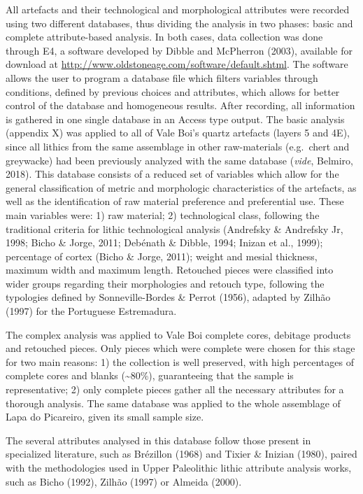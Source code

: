 \documentclass[12pt,twoside]{reedthesis}
\begin{document}
All artefacts and their technological and morphological attributes were recorded using two different databases, thus dividing the analysis in two phases: basic and complete attribute-based analysis.
In both cases, data collection was done through E4, a software developed by Dibble and McPherron (2003), available for download at \url{http://www.oldstoneage.com/software/default.shtml}. The software allows the user to program a database file which filters variables through conditions, defined by previous choices and attributes, which allows for better control of the database and homogeneous results. After recording, all information is gathered in one single database in an Access type output.
The basic analysis (appendix X) was applied to all of Vale Boi's quartz artefacts (layers 5 and 4E), since all lithics from the same assemblage in other raw-materials (e.g.~chert and greywacke) had been previously analyzed with the same database (\emph{vide}, Belmiro, 2018). This database consists of a reduced set of variables which allow for the general classification of metric and morphologic characteristics of the artefacts, as well as the identification of raw material preference and preferential use. These main variables were: 1) raw material; 2) technological class, following the traditional criteria for lithic technological analysis (Andrefsky \& Andrefsky Jr, 1998; Bicho \& Jorge, 2011; Debénath \& Dibble, 1994; Inizan et al., 1999); percentage of cortex (Bicho \& Jorge, 2011); weight and mesial thickness, maximum width and maximum length. Retouched pieces were classified into wider groups regarding their morphologies and retouch type, following the typologies defined by Sonneville-Bordes \& Perrot (1956), adapted by Zilhão (1997) for the Portuguese Estremadura.

The complex analysis was applied to Vale Boi complete cores, debitage products and retouched pieces. Only pieces which were complete were chosen for this stage for two main reasons: 1) the collection is well preserved, with high percentages of complete cores and blanks (\textasciitilde80\%), guaranteeing that the sample is representative; 2) only complete pieces gather all the necessary attributes for a thorough analysis. The same database was applied to the whole assemblage of Lapa do Picareiro, given its small sample size.

The several attributes analysed in this database follow those present in specialized literature, such as Brézillon (1968) and Tixier \& Inizian (1980), paired with the methodologies used in Upper Paleolithic lithic attribute analysis works, such as Bicho (1992), Zilhão (1997) or Almeida (2000).
\end{document}
